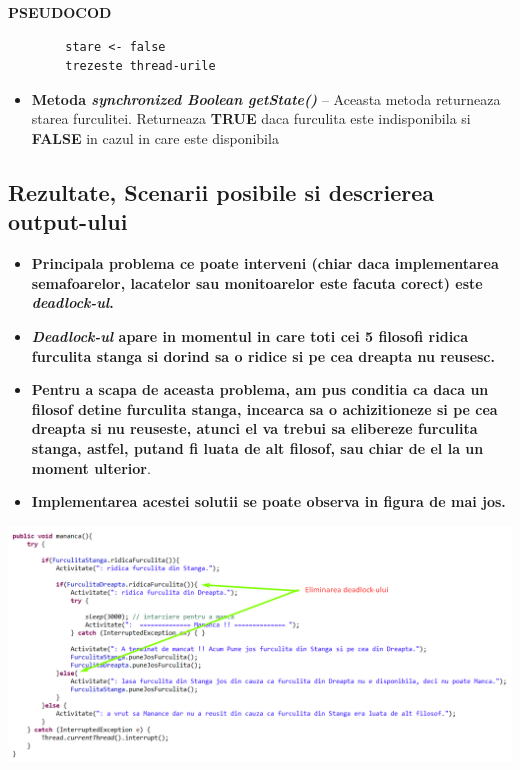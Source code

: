 \documentclass[14pt]{article}
\begin{document}
 
 \textbf{PSEUDOCOD}
 \begin{lstlisting}
		stare <- false
		trezeste thread-urile
\end{lstlisting}

\begin{itemize}
\item \textbf{Metoda \textit{synchronized Boolean getState()}} -- Aceasta metoda returneaza starea furculitei. Returneaza \textbf{TRUE} daca furculita este indisponibila si \textbf{FALSE} in cazul in care este disponibila
\end{itemize}

\newpage


\subsection{Rezultate, Scenarii posibile si descrierea output-ului}

\vspace{5 mm}

\begin{itemize}
\item \textbf{Principala problema ce poate interveni (chiar daca implementarea semafoarelor, lacatelor sau monitoarelor este facuta corect) este \textit{deadlock-ul}.}
\item \textbf{\textit{Deadlock-ul} apare in momentul in care toti cei 5 filosofi ridica furculita stanga si dorind sa o ridice si pe cea dreapta nu reusesc. }
\item \textbf{Pentru a scapa de aceasta problema, am pus conditia ca daca un filosof detine furculita stanga, incearca sa o achizitioneze si pe cea dreapta si nu reuseste, atunci el va trebui sa elibereze furculita stanga, astfel, putand fi luata de alt filosof, sau chiar de el la un moment ulterior}.
\item \textbf{Implementarea acestei solutii se poate observa in figura de mai jos.}
\end{itemize}

\vspace{5 mm}

\begin{center}\includegraphics[height=2.8 in, width = 4.9 in]{Eliminare_deadlock.png}
\end{center}
\end{document}
